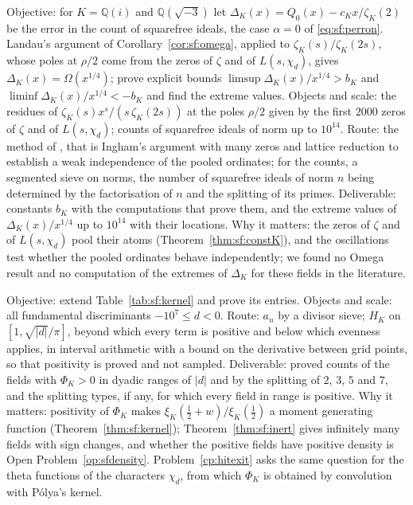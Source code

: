 \begin{compproblem}\label{cp:sfideals}
Objective: for $K=\mathbb Q(i)$ and $\mathbb Q(\sqrt{-3})$ let $\Delta_K(x)=Q_0(x)-c_Kx/\zeta_K(2)$ be the error in the count of squarefree ideals, the case $\alpha=0$ of \eqref{eq:sf:perron}. Landau's argument of Corollary~\ref{cor:sf:omega}, applied to $\zeta_K(s)/\zeta_K(2s)$, whose poles at $\rho/2$ come from the zeros of $\zeta$ and of $L(s,\chi_d)$, gives $\Delta_K(x)=\Omega(x^{1/4})$; prove explicit bounds $\limsup\Delta_K(x)/x^{1/4}>b_K$ and $\liminf\Delta_K(x)/x^{1/4}<-b_K$ and find the extreme values. Objects and scale: the residues of $\zeta_K(s)x^s/(s\,\zeta_K(2s))$ at the poles $\rho/2$ given by the first $2000$ zeros of $\zeta$ and of $L(s,\chi_d)$; counts of squarefree ideals of norm up to $10^{14}$. Route: the method of \cite{mot2021}, that is Ingham's argument with many zeros and lattice reduction to establish a weak independence of the pooled ordinates; for the counts, a segmented sieve on norms, the number of squarefree ideals of norm $n$ being determined by the factorisation of $n$ and the splitting of its primes. Deliverable: constants $b_K$ with the computations that prove them, and the extreme values of $\Delta_K(x)/x^{1/4}$ up to $10^{14}$ with their locations. Why it matters: the zeros of $\zeta$ and of $L(s,\chi_d)$ pool their atoms (Theorem~\ref{thm:sf:constK}), and the oscillations test whether the pooled ordinates behave independently; we found no Omega result and no computation of the extremes of $\Delta_K$ for these fields in the literature.
\end{compproblem}

\begin{compproblem}\label{cp:sfkernel}
Objective: extend Table~\ref{tab:sf:kernel} and prove its entries. Objects and scale: all fundamental discriminants $-10^7\le d<0$. Route: $a_n$ by a divisor sieve; $H_K$ on $[1,\sqrt{|d|}/\pi]$, beyond which every term is positive and below which evenness applies, in interval arithmetic with a bound on the derivative between grid points, so that positivity is proved and not sampled. Deliverable: proved counts of the fields with $\Phi_K>0$ in dyadic ranges of $|d|$ and by the splitting of $2$, $3$, $5$ and $7$, and the splitting types, if any, for which every field in range is positive. Why it matters: positivity of $\Phi_K$ makes $\xi_K(\frac12+w)/\xi_K(\frac12)$ a moment generating function (Theorem~\ref{thm:sf:kernel}); Theorem~\ref{thm:sf:inert} gives infinitely many fields with sign changes, and whether the positive fields have positive density is Open Problem~\ref{op:sfdensity}. Problem~\ref{cp:hitexit} asks the same question for the theta functions of the characters $\chi_d$, from which $\Phi_K$ is obtained by convolution with P\'olya's kernel.
\end{compproblem}

